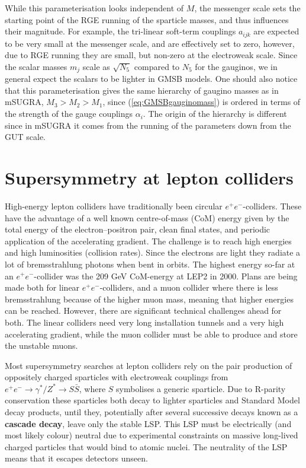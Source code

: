 \documentclass[notes.tex]{subfiles}
\begin{document}
While this parameterisation looks independent of $M$, the messenger scale sets the starting point of the RGE running of the sparticle masses, and thus influences their magnitude. For example, the tri-linear soft-term couplings $a_{ijk}$ are expected to be very small at the messenger scale, and are effectively set to zero, however, due to RGE running they are small, but non-zero at the electroweak scale. Since the scalar masses $m_j$ scale as $\sqrt{N_5}$ compared to $N_5$ for the gauginos, we in general expect the scalars to be lighter in GMSB models. One should also notice that this parameterisation  gives the same hierarchy of gaugino masses as in mSUGRA, $M_3>M_2>M_1$, since (\ref{eq:GMSBgauginomass}) is ordered in terms of the strength of the gauge couplings $\alpha_i$. The origin of the hierarchy is different since in mSUGRA it comes from the running of the parameters down from the GUT scale.



\section{Supersymmetry at lepton colliders}
High-energy lepton colliders have traditionally been circular $e^+e^-$-colliders. These have the advantage of a well known centre-of-mass (CoM) energy given by the total energy of the electron--positron pair, clean final states, and periodic application of the accelerating gradient. The challenge is to reach high energies and high luminosities (collision rates). Since the electrons are light they radiate a lot of bremsstrahlung photons when bent in orbits. The highest energy so-far at an $e^+e^-$-collider was the 209 GeV CoM-energy at LEP2 in 2000. Plans are being made both for linear  $e^+e^-$-colliders, and a muon collider where there is less bremsstrahlung because of the higher muon mass, meaning that higher energies can be reached. However, there are significant technical challenges ahead for both. The linear colliders need very long installation tunnels and a very high accelerating gradient, while the muon collider must be able to produce and store the unstable muons.

Most supersymmetry searches at lepton colliders rely on the pair production of oppositely charged sparticles with electroweak couplings from $e^+e^-\to \gamma^*/Z^*\to S\bar{S}$, where $S$ symbolises a generic sparticle. Due to R-parity conservation these sparticles both decay to lighter sparticles and Standard Model decay products, until they, potentially after several successive decays known as a {\bf cascade decay}, leave only the stable LSP. This LSP must be electrically (and most likely colour) neutral due to experimental constraints on massive long-lived charged particles that would bind to atomic nuclei. The neutrality of the LSP means that it escapes detectors unseen.
\end{document}
